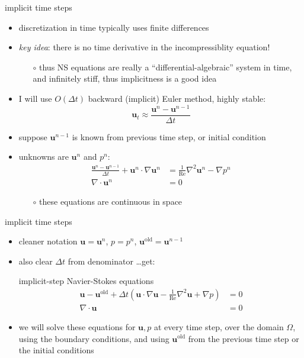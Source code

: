 \documentclass[10pt,hyperref,colorlinks]{beamer}
\newcommand{\bu}{\mathbf{u}}
\newcommand{\grad}{\nabla}
\newcommand{\Div}{\nabla\cdot}
\renewcommand{\Re}{\text{Re}}
\newcommand{\buold}{\bu^{\text{old}}}
\begin{document}
\begin{frame}{implicit time steps}

\begin{itemize}
\item discretization in time typically uses finite differences
\item \emph{key idea}: there is no time derivative in the incompressiblity equation!
    \begin{itemize}
    \item[$\circ$] thus NS equations are really a ``differential-algebraic'' system in time, and infinitely stiff, thus implicitness is a good idea
    \end{itemize}
\item I will use $O(\Delta t)$ backward (implicit) Euler method, highly stable:
	$$\bu_t \approx \frac{\bu^{n} - \bu^{n-1}}{\Delta t}$$
\item suppose $\bu^{n-1}$ is known from previous time step, or initial condition
\item unknowns are $\bu^n$ and $p^n$:
\begin{align*}
\frac{\bu^{n} - \bu^{n-1}}{\Delta t} + \bu^n \cdot \grad \bu^n &= \frac{1}{\Re}\grad^2 \bu^n - \grad p^n \\
\Div \bu^n &= 0
\end{align*}

    \begin{itemize}
    \item[$\circ$] these equations are continuous in space
    \end{itemize}
\end{itemize}
\end{frame}


\begin{frame}{implicit time steps}

\begin{itemize}
\item cleaner notation $\bu=\bu^n$, $p=p^n$, $\buold = \bu^{n-1}$
\item also clear $\Delta t$ from denominator \dots get:

\begin{block}{implicit-step Navier-Stokes equations}
\begin{align*}
\bu - \buold + \Delta t \left(\bu \cdot \grad \bu - \frac{1}{\Re}\grad^2 \bu + \grad p\right) &= 0 \\
\Div \bu &= 0
\end{align*}
\end{block}

\item we will solve these equations for $\bu,p$ \alert{at every time step}, over the domain $\Omega$, using the boundary conditions, and using $\buold$ from the previous time step or the initial conditions
\end{itemize}
\end{frame}
\end{document}
